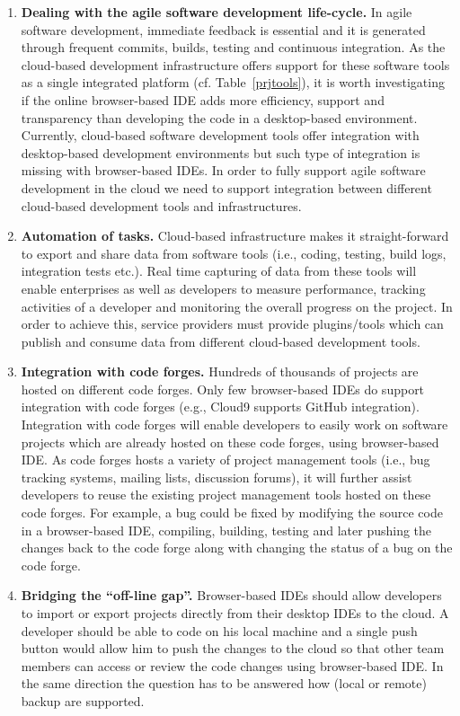\documentclass[11pt,fleqn,twoside]{article}
\begin{document}
\begin{enumerate}
    \item \textbf{Dealing with the agile software development life-cycle.} In agile software development, immediate feedback is essential and it is generated through frequent commits, builds, testing and continuous integration. As the cloud-based development infrastructure offers support for these software tools as a single integrated platform (cf. Table~\ref{prjtools}), it is worth investigating if the online browser-based IDE adds more efficiency, support and transparency than developing the code in a desktop-based environment. Currently, cloud-based software development tools offer integration with desktop-based development environments but such type of integration is missing with browser-based IDEs. In order to fully support agile software development in the cloud we need to support integration between different cloud-based development tools and infrastructures.
    \item \textbf{Automation of tasks.} Cloud-based infrastructure makes it straight-forward to export and share data from software tools (i.e., coding, testing, build logs, integration tests etc.). Real time capturing of data from these tools will enable enterprises as well as developers to measure performance, tracking activities of a developer and monitoring the overall progress on the project. In order to achieve this, service providers must provide plugins/tools which can publish and consume data from different cloud-based development tools.
    \item \textbf{Integration with code forges.} Hundreds of thousands of projects are hosted on different code forges. Only few browser-based IDEs do support integration with code forges (e.g., Cloud9 supports GitHub integration). Integration with code forges will enable developers to easily work on software projects which are already hosted on these code forges, using browser-based IDE. As code forges hosts a variety of project management tools (i.e., bug tracking systems, mailing lists, discussion forums), it will further assist developers to reuse the existing project management tools hosted on these code forges. For example, a bug could be fixed by modifying the source code in a browser-based IDE, compiling, building, testing and later pushing the changes back to the code forge along with changing the status of a bug on the code forge.
    \item \textbf{Bridging the ``off-line gap''.} Browser-based IDEs should allow developers to import or export projects directly from their desktop IDEs to the cloud. A developer should be able to code on his local machine and a single push button would allow him to push the changes to the cloud so that other team members can access or review the code changes using browser-based IDE. In the same direction the question has to be answered how (local or remote) backup are supported.
\end{enumerate}
\end{document}
